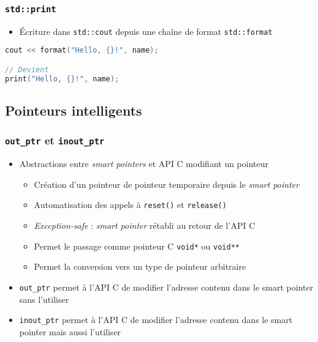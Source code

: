 \documentclass[C++.tex]{subfiles}
\begin{document}
\begin{frame}[fragile]
	\frametitle{\lstinline|std::print|}
	\begin{itemize}
		\item Écriture dans \lstinline|std::cout| depuis une chaîne de format \lstinline|std::format|
	\end{itemize}

	\begin{lstlisting}[language=C++]
cout << format("Hello, {}!", name);

// Devient
print("Hello, {}!", name);\end{lstlisting}
\end{frame}

\subsection*{Pointeurs intelligents}
\begin{frame}[fragile]
	\frametitle{\lstinline|out_ptr| et \lstinline|inout_ptr|}
	\begin{itemize}
		\item Abstractions entre \textit{smart pointers} et API C modifiant un pointeur


		\begin{itemize}
			\item Création d'un pointeur de pointeur temporaire depuis le \textit{smart pointer}
			\item Automatisation des appels à \lstinline|reset()| et \lstinline|release()|
			\item \textit{Exception-safe} : \textit{smart pointer} rétabli au retour de l'API C	


			\item Permet le passage comme pointeur C \lstinline|void*| ou \lstinline|void**|
			\item Permet la conversion vers un type de pointeur arbitraire
		\end{itemize}
		\item \lstinline|out_ptr| permet à l'API C de modifier l'adresse contenu dans le smart pointer sans l'utiliser
		\item \lstinline|inout_ptr| permet à l'API C de modifier l'adresse contenu dans le smart pointer mais aussi l'utiliser
	\end{itemize}
\end{frame}
\end{document}
